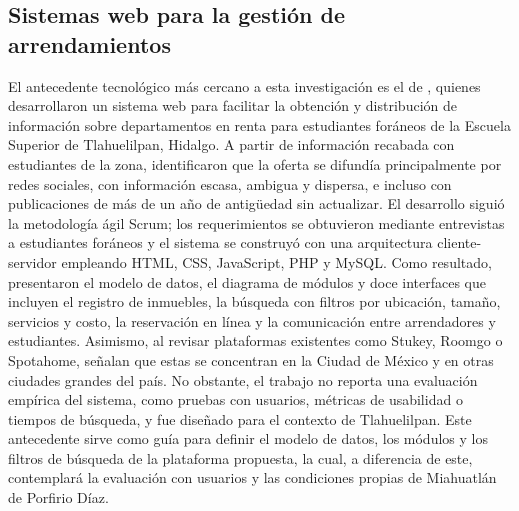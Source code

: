 \subsection{Sistemas web para la gestión de arrendamientos}

El antecedente tecnológico más cercano a esta investigación es el de \textcite{MejiaAvecias2023}, quienes desarrollaron un sistema web para facilitar la obtención y distribución de información sobre departamentos en renta para estudiantes foráneos de la Escuela Superior de Tlahuelilpan, Hidalgo. A partir de información recabada con estudiantes de la zona, identificaron que la oferta se difundía principalmente por redes sociales, con información escasa, ambigua y dispersa, e incluso con publicaciones de más de un año de antigüedad sin actualizar. El desarrollo siguió la metodología ágil Scrum; los requerimientos se obtuvieron mediante entrevistas a estudiantes foráneos y el sistema se construyó con una arquitectura cliente-servidor empleando HTML, CSS, JavaScript, PHP y MySQL. Como resultado, presentaron el modelo de datos, el diagrama de módulos y doce interfaces que incluyen el registro de inmuebles, la búsqueda con filtros por ubicación, tamaño, servicios y costo, la reservación en línea y la comunicación entre arrendadores y estudiantes. Asimismo, al revisar plataformas existentes como Stukey, Roomgo o Spotahome, señalan que estas se concentran en la Ciudad de México y en otras ciudades grandes del país. No obstante, el trabajo no reporta una evaluación empírica del sistema, como pruebas con usuarios, métricas de usabilidad o tiempos de búsqueda, y fue diseñado para el contexto de Tlahuelilpan. Este antecedente sirve como guía para definir el modelo de datos, los módulos y los filtros de búsqueda de la plataforma propuesta, la cual, a diferencia de este, contemplará la evaluación con usuarios y las condiciones propias de Miahuatlán de Porfirio Díaz.

